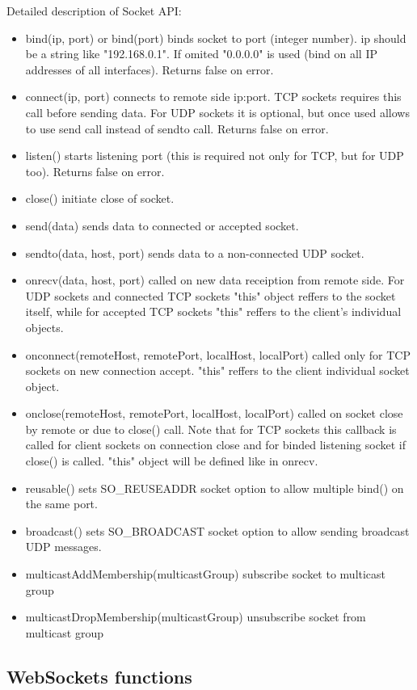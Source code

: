 Detailed description of Socket API:
\begin{itemize}
\item bind(ip, port) or bind(port) binds socket to port (integer number). ip should be a 
string like "192.168.0.1". If omited "0.0.0.0" is used (bind on all IP addresses of all 
interfaces). Returns false on error.
\item connect(ip, port) connects to remote side ip:port. TCP sockets requires this call 
before sending data. For UDP sockets it is optional, but once used allows to use send call 
instead of sendto call. Returns false on error.
\item listen() starts listening port (this is required not only for TCP, but for UDP too). 
Returns false on error.
\item close() initiate close of socket.
\item send(data) sends data to connected or accepted socket.
\item sendto(data, host, port) sends data to a non-connected UDP socket.
\item onrecv(data, host, port) called on new data receiption from remote side. For UDP 
sockets and connected TCP sockets "this" object reffers to the socket itself, while for 
accepted TCP sockets "this" reffers to the client's individual objects.
\item onconnect(remoteHost, remotePort, localHost, localPort) called only for TCP sockets 
on new connection accept. "this" reffers to the client individual socket object.
\item onclose(remoteHost, remotePort, localHost, localPort) called on socket close by 
remote or due to close() call. Note that for TCP sockets this callback is called for client 
sockets on connection close and for binded listening socket if close() is called. "this" 
object will be defined like in onrecv.
\item reusable() sets SO\_REUSEADDR socket option to allow multiple bind() on the same port.
\item broadcast() sets SO\_BROADCAST socket option to allow sending broadcast UDP messages.
\item multicastAddMembership(multicastGroup) subscribe socket to multicast group
\item multicastDropMembership(multicastGroup) unsubscribe socket from multicast group
\end{itemize}

\subsection{WebSockets functions}

